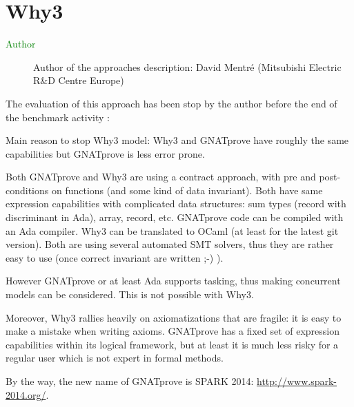 \chapter{Why3}


\begin{description}
\item[\textcolor{green}{Author}] Author of the approaches description: David Mentré (Mitsubishi Electric R\&D Centre
Europe)
\end{description}

The evaluation of this approach has been stop by the author before the end of the benchmark activity :


\begin{author_comment}

Main reason to stop Why3 model: Why3 and GNATprove have roughly the same capabilities but GNATprove is less error prone.

Both GNATprove and Why3 are using a contract approach, with pre and post-conditions on functions (and some kind of data invariant). Both have same expression capabilities with complicated data structures: sum types (record with discriminant in Ada), array, record, etc. GNATprove code can be compiled with an Ada compiler. Why3 can be translated to OCaml (at least for the latest git version). Both are using several automated SMT solvers, thus they are rather easy to use (once correct invariant are written ;-) ).

However GNATprove or at least Ada supports tasking, thus making concurrent models can be considered. This is not possible with Why3.

Moreover, Why3 rallies heavily on axiomatizations that are fragile: it is easy to make a mistake when writing axioms. GNATprove has a fixed set of expression capabilities within its logical framework, but at least it is much less risky for a regular user which is not expert in formal methods.

By the way, the new name of GNATprove is SPARK 2014: \url{http://www.spark-2014.org/}.

\end{author_comment}



